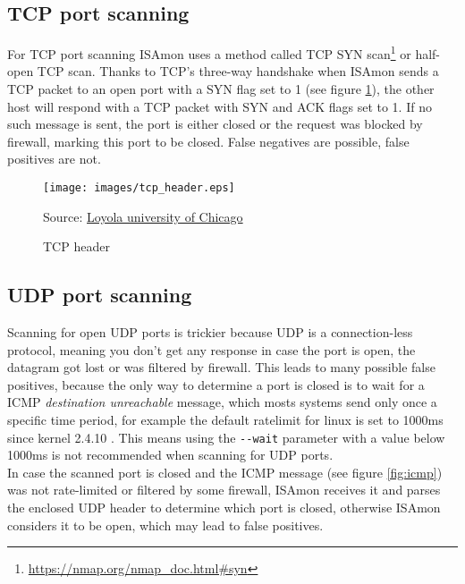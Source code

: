 \documentclass[11pt,a4paper]{article}
\newcommand{\source}[1]{\caption*{Source: {#1}} }
\begin{document}
	\subsection{TCP port scanning}
		For TCP port scanning ISAmon uses a method called TCP SYN scan\footnote{\url{https://nmap.org/nmap_doc.html\#syn}} or half-open TCP scan. Thanks to TCP's three-way handshake when ISAmon sends a TCP packet to an open port with a SYN flag set to 1 (see figure \ref{fig:tcp_header}), the other host will respond with a TCP packet with SYN and ACK flags set to 1. If no such message is sent, the port is either closed or the request was blocked by firewall, marking this port to be closed. False negatives are possible, false positives are not.\\

		\begin{figure}[h]
			\centering
			\texttt{[image: images/tcp\_header.eps]}
			\caption{TCP header}
			\label{fig:tcp_header}
			\source{\href{http://intronetworks.cs.luc.edu/1/html/tcp.html}{Loyola university of Chicago}}
		\end{figure}
        

	\subsection{UDP port scanning}
		Scanning for open UDP ports is trickier because UDP is a connection-less protocol, meaning you don't get any response in case the port is open, the datagram got lost or was filtered by firewall. This leads to many possible false positives, because the only way to determine a port is closed is to wait for a ICMP \emph{destination unreachable} message, which mosts systems send only once a specific time period, for example the default ratelimit for linux is set to 1000ms since kernel 2.4.10 \cite{man7:icmp}. This means using the \texttt{-{}-wait} parameter with a value below 1000ms is not recommended when scanning for UDP ports.\\
		In case the scanned port is closed and the ICMP message (see figure \ref{fig:icmp}) was not rate-limited or filtered by some firewall, ISAmon receives it and parses the enclosed UDP header to determine which port is closed, otherwise ISAmon considers it to be open, which may lead to false positives.



\newpage

\end{document}
